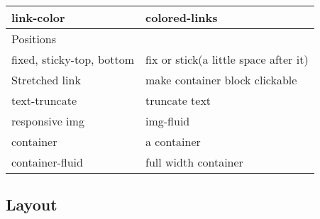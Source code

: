 \documentclass{article}
\begin{document}
\begin{longtable}{ll}
			link-color                                  & colored-links                                                                   \\ \hline
			Positions                                   &                                                                                 \\ \hline
			{fixed, sticky}-{top, bottom}               & fix or stick(a little space after it)                                           \\ \hline
			Stretched link                              & make container block clickable                                                  \\ \hline
			text-truncate                               & truncate text                                                                   \\
			responsive img                              & img-fluid \\\hline 
			container & a container  \\
			container-fluid & full width container \\
			
		\end{longtable} 
		\subsection{Layout}
			
\end{document}
